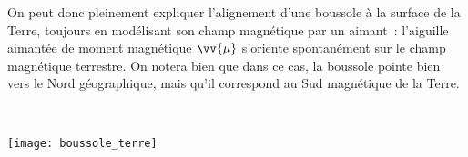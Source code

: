 \documentclass[../main/main.tex]{subfiles}
\begin{document}
\begin{minipage}[t]{.5\linewidth}
	On peut donc pleinement expliquer l'alignement d'une boussole à la surface de la
	Terre, toujours en modélisant son champ magnétique par un aimant~: l'aiguille
	aimantée de moment magnétique $\vv{\mu}$ s'oriente spontanément sur le champ
	magnétique terrestre.
	\bigbreak
	On notera bien que dans ce cas, la boussole pointe bien
	vers le Nord géographique, mais qu'il correspond au Sud magnétique de la Terre.
\end{minipage}
\hfill
\begin{minipage}[t]{.5\linewidth}
	~
	\vspace*{-40pt}
	\begin{center}
		\texttt{[image: boussole\_terre]}
		\label{fig:bterre}
	\end{center}
\end{minipage}
\end{document}
